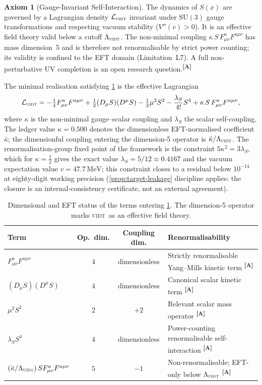 \documentclass[12pt,a4paper,twoside]{article}
\theoremstyle{plain}
\theoremstyle{definition}
\newtheorem{axiom}{Axiom}
\theoremstyle{remark}
\newcommand{\UIDT}{\textsc{uidt}}
\newcommand{\MeV}{\,\mathrm{MeV}}
\newcommand{\catmark}[1]{\textsuperscript{\textsf{\textbf{[#1]}}}}
\newcommand{\Sx}{S(x)}
\newcommand{\lambdaS}{5/12 \approx 0.4167} %
\newcommand{\kappaVal}{0.500} %
\newcommand{\vVEV}{47.7\MeV} %
\begin{document}
\begin{axiom}[Gauge-Invariant Self-Interaction]
\label{ax:gauge}
The dynamics of $\Sx$ are governed by a Lagrangian density $\mathcal{L}_{\UIDT}$ invariant under $\mathrm{SU}(3)$ gauge transformations and respecting vacuum stability ($V''(v)>0$). It is an effective field theory valid below a cutoff $\Lambda_{\UIDT}$. The non-minimal coupling $\kappa\,S\,F_{\mu\nu}^a F^{a\mu\nu}$ has mass dimension~5 and is therefore not renormalisable by strict power counting; its validity is confined to the EFT domain (Limitation~L7). A full non-perturbative UV completion is an open research question.\catmark{A}
\end{axiom}

\noindent The minimal realisation satisfying \cref{ax:gauge} is the effective Lagrangian
\begin{equation}
 \mathcal{L}_{\UIDT}
 = -\tfrac{1}{4}F_{\mu\nu}^a F^{a\mu\nu}
 + \tfrac{1}{2}(D_\mu S)(D^\mu S)
 - \tfrac{1}{2}\mu^2 S^2
 - \frac{\lambda_S}{4!}S^4
 + \kappa\,S\,F_{\mu\nu}^a F^{a\mu\nu},
 \label{eq:lagrangian}
\end{equation}
where $\kappa$ is the non-minimal gauge--scalar coupling and $\lambda_S$ the scalar self-coupling. The ledger value $\kappa=\kappaVal$ denotes the dimensionless EFT-normalised coefficient $\bar\kappa$; the dimensionful coupling entering the dimension-5 operator is $\bar\kappa/\Lambda_{\UIDT}$. The renormalisation-group fixed point of the framework is the constraint $5\kappa^2 = 3\lambda_S$, which for $\kappa = \tfrac{1}{2}$ gives the exact value $\lambda_S = \lambdaS$ and the vacuum expectation value $v = \vVEV$; this constraint closes to a residual below $10^{-14}$ at eighty-digit working precision (\cref{prop:target-leakage} discipline applies: the closure is an internal-consistency certificate, not an external agreement).

\begin{table}[H]
\centering
\scriptsize
\caption{Dimensional and EFT status of the terms entering \cref{ax:gauge}.
The dimension-5 operator marks \UIDT\ as an effective field theory.}
\label{tab:eft-dimensions}
\renewcommand{\arraystretch}{1.25}
\begin{tabular}{p{} c c p{}}
\toprule
\textbf{Term} & \textbf{Op.\ dim.} & \textbf{Coupling dim.} & \textbf{Renormalisability} \\
\midrule
$F_{\mu\nu}^a F^{a\mu\nu}$ & $4$ & dimensionless & Strictly renormalisable Yang--Mills kinetic term \catmark{A} \\
$(D_\mu S)(D^\mu S)$ & $4$ & dimensionless & Canonical scalar kinetic term \catmark{A} \\
$\mu^2 S^2$ & $2$ & $+2$ & Relevant scalar mass operator \catmark{A} \\
$\lambda_S S^4$ & $4$ & dimensionless & Power-counting renormalisable self-interaction \catmark{A} \\
$(\bar\kappa/\Lambda_{\UIDT})\,S F_{\mu\nu}^a F^{a\mu\nu}$ & $5$ & $-1$ & Non-renormalisable; EFT-only below $\Lambda_{\UIDT}$ \catmark{A} \\
\bottomrule
\end{tabular}
\end{table}
\end{document}
